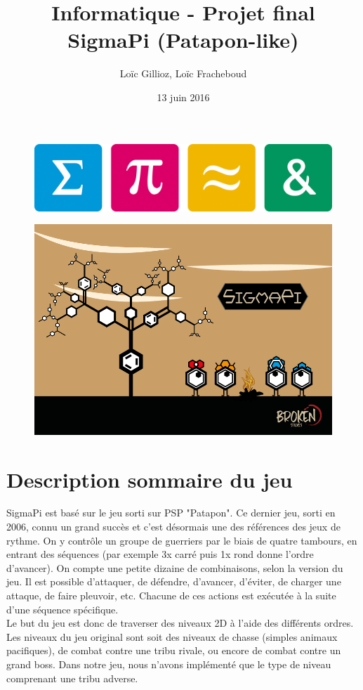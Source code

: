 \documentclass[a4paper,10pt]{article}
\author{Loïc Gillioz, Loïc Fracheboud}
\title{Informatique - Projet final \\ \Huge SigmaPi (Patapon-like)}
\date{13 juin 2016}
\begin{document}
 \maketitle
 \begin{figure}[!h]
 \centering

 \includegraphics[scale=0.15]{images/icones}
 \end{figure}
 \begin{figure}[!h]
 \centering
 \includegraphics[scale=0.5]{images/couverture}
 \end{figure}
 \pagebreak
 
 \section{Description sommaire du jeu}
  SigmaPi est basé sur le jeu sorti sur PSP "Patapon". Ce dernier jeu, sorti en 2006, connu un grand succès et c'est désormais une des références des jeux de rythme. On y contrôle un groupe de guerriers par le biais de quatre tambours, en entrant des séquences (par exemple 3x carré puis 1x rond donne l'ordre d'avancer). On compte une petite dizaine de combinaisons, selon la version du jeu. Il est possible d'attaquer, de défendre, d'avancer, d'éviter, de charger une attaque, de faire pleuvoir, etc. Chacune de ces actions est exécutée à la suite d'une séquence spécifique. \\
Le but du jeu est donc de traverser des niveaux 2D à l'aide des différents ordres. Les niveaux du jeu original sont soit des niveaux de chasse (simples animaux pacifiques), de combat contre une tribu rivale, ou encore de combat contre un grand boss.
Dans notre jeu, nous n'avons implémenté que le type de niveau comprenant une tribu adverse.
\end{document}
